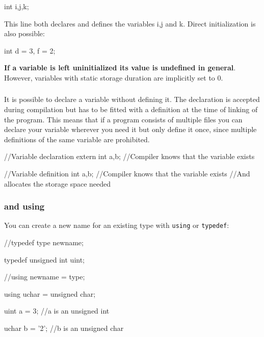 \documentclass[10pt,a4paper]{scrartcl}
\begin{document}
\begin{multicols*}{2}
\begin{TPCpp}
int i,j,k;
\end{TPCpp}

This line both declares and defines the variables i,j and k.
Direct initialization is also possible:

\begin{TPCpp}
int d = 3, f = 2;
\end{TPCpp}

\textbf{If a variable is left uninitialized its value is undefined in general}. However, variables with static storage duration are implicitly set to 0.

\subsubsection{}

It is possible to declare a variable without defining it. The declaration is accepted during compilation but has to be fitted with a definition at the time of linking of the program. This means that if a program consists of multiple files you can declare your variable wherever you need it but only define it once, since multiple definitions of the same variable are prohibited.

\begin{TPCpp}
//Variable declaration
extern int a,b; //Compiler knows that the variable exists

//Variable definition
int a,b; //Compiler knows that the variable exists
         //And allocates the storage space needed
\end{TPCpp}

\subsubsection{ and using}

You can create a new name for an existing type with \verb+using+ or \verb+typedef+:

\begin{TPCpp}
//typedef type newname;

typedef unsigned int uint;

//using newname = type;

using uchar = unsigned char;

uint a = 3; //a is an unsigned int

uchar b = '2'; //b is an unsigned char
\end{TPCpp}


\end{multicols*}
\end{document}
